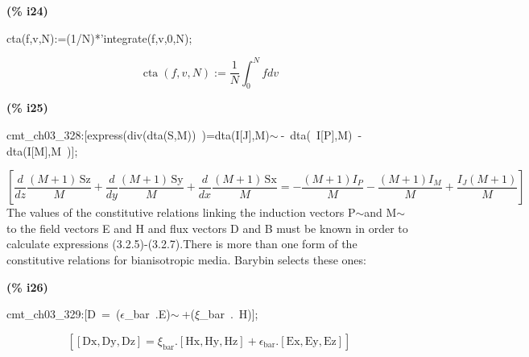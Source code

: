 \documentclass[fleqn]{article}
\begin{document}
\noindent
\begin{minipage}[t]{4.000000em}\color{red}\bfseries
(\% i24)	
\end{minipage}
\begin{minipage}[t]{\textwidth}\color{blue}
cta(f,v,N):=(1/N)*'integrate(f,v,0,N);
\end{minipage}
\[\displaystyle \tag{\% o24} 
\operatorname{cta}\left( f\operatorname{,}v\operatorname{,}N\right) \operatorname{:=}\frac{1}{N} \int_{0}^{N}{\left. fdv\right.}\mbox{}
\]


\noindent
\begin{minipage}[t]{4.000000em}\color{red}\bfseries
(\% i25)	
\end{minipage}
\begin{minipage}[t]{\textwidth}\color{blue}
cmt\_ch03\_328:[express(div(dta(S,M))\ )=dta(I[J],M)\ensuremath{\sim\ }-\ dta(\ I[P],M)\ -dta(I[M],M\ )];
\end{minipage}
\[\displaystyle \tag{cmt\_ ch03\_ 328} 
\left[ \frac{d}{d z} \frac{\left( M+1\right) \, \ensuremath{\mathrm{Sz}}}{M}+\frac{d}{d y} \frac{\left( M+1\right) \, \ensuremath{\mathrm{Sy}}}{M}+\frac{d}{d x} \frac{\left( M+1\right) \, \ensuremath{\mathrm{Sx}}}{M}=-\frac{\left( M+1\right)  {I_P}}{M}-\frac{\left( M+1\right)  {I_M}}{M}+\frac{{I_J} \left( M+1\right) }{M}\right] \mbox{}
\]
The values of the constitutive relations linking the induction vectors P\ensuremath{\sim }and M\ensuremath{\sim }to the field vectors E and H and flux vectors D and B must be known in order to calculate expressions (3.2.5)-(3.2.7).There is more than one form of the constitutive relations for bianisotropic media. Barybin selects these ones:


\noindent
\begin{minipage}[t]{4.000000em}\color{red}\bfseries
(\% i26)	
\end{minipage}
\begin{minipage}[t]{\textwidth}\color{blue}
cmt\_ch03\_329:[D\ =\ (\ensuremath{\epsilon}\_bar\ .E)\ensuremath{\sim\ }+(\ensuremath{\xi}\_bar\ .\ H)];
\end{minipage}
\[\displaystyle \tag{cmt\_ ch03\_ 329} 
\left[ \left[ \ensuremath{\mathrm{Dx}}\operatorname{,}\ensuremath{\mathrm{Dy}}\operatorname{,}\ensuremath{\mathrm{Dz}}\right] ={{\xi }_{\ensuremath{\mathrm{bar}}}}\ensuremath{\mathrm{ . }}\left[ \ensuremath{\mathrm{Hx}}\operatorname{,}\ensuremath{\mathrm{Hy}}\operatorname{,}\ensuremath{\mathrm{Hz}}\right] +{{\epsilon }_{\ensuremath{\mathrm{bar}}}}\ensuremath{\mathrm{ . }}\left[ \ensuremath{\mathrm{Ex}}\operatorname{,}\ensuremath{\mathrm{Ey}}\operatorname{,}\ensuremath{\mathrm{Ez}}\right] \right] \mbox{}
\]
\end{document}
